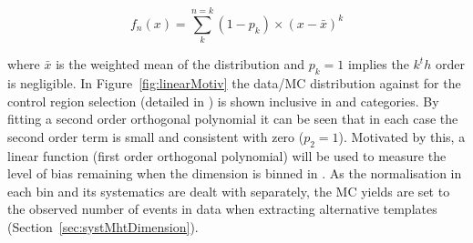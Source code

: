 \begin{equation}
  \label{equ:orthog-polynomial}
  f_n(x) = \sum_k^{n=k}{(1-p_k)\times(x-\bar{x})^k}
\end{equation}

where $\bar{x}$ is the weighted mean of the distribution and $p_k = 1$ 
implies the $k^th$ order is negligible.
In Figure~\ref{fig:linearMotiv} the data/MC 
distribution against \mht for the control region selection 
(detailed in \cite{CMS_AN_2013-366}) is shown inclusive 
in \scalht and categories. By fitting a second order orthogonal polynomial
it can be seen that in each case the second order 
term is small and consistent with zero ($p_2 = 1$). 
Motivated by this, a linear function (first order orthogonal polynomial)
will be used to measure the level of bias remaining when the \mht dimension is binned in \scalht. 
As the normalisation in each \scalht bin and its systematics 
are dealt with separately, the MC yields are set to the observed 
number of events in data when extracting alternative templates 
(Section~\ref{sec:systMhtDimension}).
